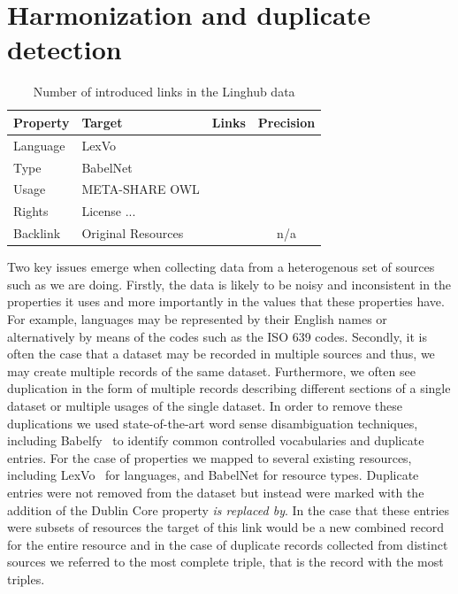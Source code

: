 \documentclass[11pt]{article}
\begin{document}
\section{Harmonization and duplicate detection}

\begin{table}
	\centering	
	\begin{tabular}{p{50mm}p{50mm}|cc}
	Property     & Target             & Links        & Precision \\
	\hline
	Language     & LexVo              &              &           \\
	Type         & BabelNet           &              &           \\
	Usage        & META-SHARE OWL     &              &           \\
	Rights       & License ...        &              &           \\
	Backlink     & Original Resources &              & n/a       \\
	\end{tabular}
	\caption{Number of introduced links in the Linghub data\label{tab:links}}
\end{table}	

Two key issues emerge when collecting data from a heterogenous set of sources 
such as we are doing. Firstly, the data is likely to be noisy and inconsistent 
in the properties it uses and more importantly in the values that these
properties have. For example, languages may be represented by their English 
names or alternatively by means of the codes such as the ISO 639 codes. Secondly,
it is often the case that a dataset may be recorded in multiple sources and thus,
we may create multiple records of the same dataset. Furthermore, we often see
duplication in the form of multiple records describing different sections of a 
single dataset or multiple usages of the single dataset. In order to remove 
these duplications we used state-of-the-art word sense disambiguation techniques, 
including Babelfy~\cite{} to identify common controlled vocabularies and duplicate
entries. For the case of properties we mapped to several existing resources, 
including LexVo~\cite{} for languages, and BabelNet for resource types. Duplicate 
entries were not removed from the dataset but instead were marked with the addition
of the Dublin Core property \emph{is replaced by}. In the case that these entries
were subsets of resources the target of this link would be a new combined record
for the entire resource and in the case of duplicate records collected from distinct
sources we referred to the most complete triple, that is the record with the most
triples.
\end{document}
